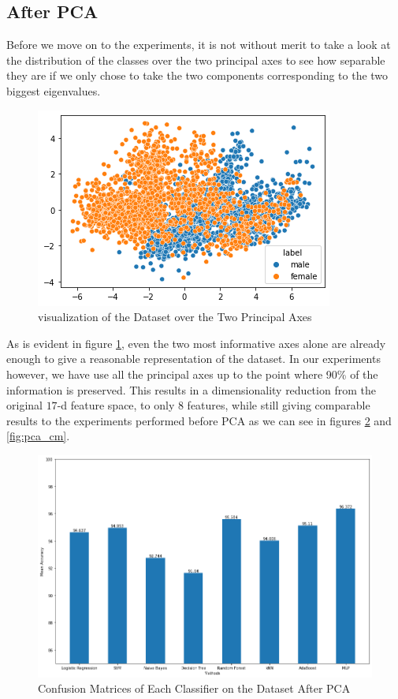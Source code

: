 \documentclass[journal,onecolumn]{IEEEtran}
\begin{document}
\subsection{After PCA}
Before we move on to the experiments, it is not without merit to take a look at the 
distribution of the classes over the two principal axes to see how separable they are
if we only chose to take the two components corresponding to the two biggest eigenvalues.
\begin{figure}[t]
  \centering
  \includegraphics[width=0.6\linewidth]{figures/pca_visualization.png}
  \caption{visualization of the Dataset over the Two Principal Axes}
  \label{fig:pca_vis}
\end{figure}
As is evident in figure \ref{fig:pca_vis}, even the two most informative axes alone are already enough to give a reasonable representation
of the dataset. In our experiments however, we have use all the principal axes up to the point where 90\% of the information is preserved.
This results in a dimensionality reduction from the original $17$-d feature space, to only $8$ features, while still giving comparable results
to the experiments performed before PCA as we can see in figures \ref{fig:pca_comp} and \ref{fig:pca_cm}. 
\begin{figure}[h]
  \centering
  \includegraphics[width=0.95\linewidth]{figures/pca_comparison.png}
  \caption{Confusion Matrices of Each Classifier on the Dataset After PCA}
  \label{fig:pca_comp}
\end{figure}
\end{document}
